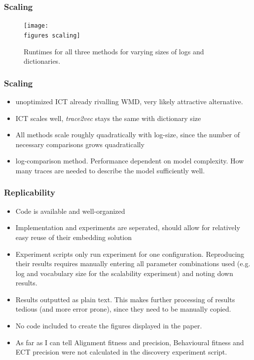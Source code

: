 \documentclass{beamer}
\newcommand{\figures}{../figures/}
\newcommand{\pro}{\item[\color{green}\textbf{+}\color{black}]}
\newcommand{\con}{\item[\color{red}\boldmath{$-$}\color{black}]}
\begin{document}
	
	\begin{frame}
		\frametitle{Scaling}
		\begin{figure}
			\texttt{[image: \\figures scaling]}
			\caption{Runtimes for all three methods for varying sizes of logs and dictionaries.}
			\label{fig:scalability}
		\end{figure}
	\end{frame}
	
	
	\begin{frame}
		\frametitle{Scaling}
		\begin{itemize}
			\item unoptimized ICT already rivalling WMD, very likely attractive alternative.
			\item ICT scales well, \emph{trace2vec} stays the same with dictionary size
			\item All methods scale roughly quadratically with log-size, since the number of necessary comparisons grows quadratically
			\item log-comparison method. Performance dependent on model complexity. How many traces are needed to describe the model sufficiently well.
		\end{itemize}
	\end{frame}
	
	\begin{frame}
		\frametitle{Replicability}
		\begin{itemize}
			 \pro<1-> Code  is available and well-organized
			 \pro<2-> Implementation and experiments are seperated, should allow for relatively easy reuse of their embedding solution
			 \con<3-> Experiment scripts only run experiment for one configuration. Reproducing their results requires manually entering all parameter combinations used (e.g. log and vocabulary size for the scalability experiment) and noting down results.
			 \con<4-> Results outputted as plain text. This makes further processing of results tedious (and more error prone), since they need to be manually copied.
			 \con<5-> No code included to create the figures displayed in the paper.
			 \con<6-> As far as I can tell Alignment fitness and precision, Behavioural fitness and ECT precision were not calculated in the discovery experiment script.
		\end{itemize}
	\end{frame}
	
\end{document}
